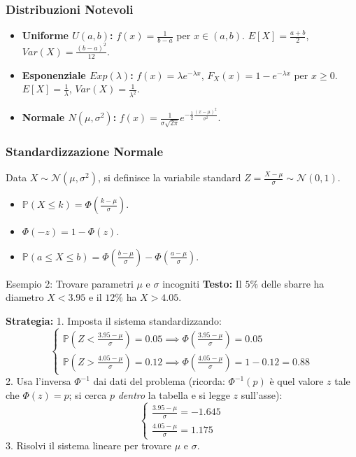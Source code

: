 \documentclass[12pt]{extarticle} %
\begin{document}
\subsubsection{Distribuzioni Notevoli}
\begin{itemize}
    \item \textbf{Uniforme $U(a,b)$:} $f(x) = \frac{1}{b-a}$ per $x \in (a,b)$. $E[X] = \frac{a+b}{2}$, $Var(X) = \frac{(b-a)^2}{12}$.
    \item \textbf{Esponenziale $Exp(\lambda)$:} $f(x) = \lambda e^{-\lambda x}$, $F_X(x) = 1 - e^{-\lambda x}$ per $x \ge 0$. $E[X] = \frac{1}{\lambda}$, $Var(X) = \frac{1}{\lambda^2}$.
    \item \textbf{Normale $N(\mu, \sigma^2)$:} $f(x) = \frac{1}{\sigma\sqrt{2\pi}} e^{-\frac{1}{2}\frac{(x-\mu)^2}{\sigma^2}}$.
\end{itemize}

\subsubsection{Standardizzazione Normale}
Data $X \sim \mathcal{N}(\mu, \sigma^2)$, si definisce la variabile standard $Z = \frac{X-\mu}{\sigma} \sim \mathcal{N}(0,1)$.
\begin{itemize}
    \item $\mathbb{P}(X \le k) = \Phi\left(\frac{k-\mu}{\sigma}\right)$.
    \item $\Phi(-z) = 1 - \Phi(z)$.
    \item $\mathbb{P}(a \le X \le b) = \Phi\left(\frac{b-\mu}{\sigma}\right) - \Phi\left(\frac{a-\mu}{\sigma}\right)$.
\end{itemize}

\begin{eserciziobox}{Esempio 2: Trovare parametri $\mu$ e $\sigma$ incogniti}
\textbf{Testo:} Il $5\%$ delle sbarre ha diametro $X < 3.95$ e il $12\%$ ha $X > 4.05$.
\par\textbf{Strategia:}
1. Imposta il sistema standardizzando:
   \[ \begin{cases} \mathbb{P}(Z < \frac{3.95-\mu}{\sigma}) = 0.05 \implies \Phi(\frac{3.95-\mu}{\sigma}) = 0.05 \\ \mathbb{P}(Z > \frac{4.05-\mu}{\sigma}) = 0.12 \implies \Phi(\frac{4.05-\mu}{\sigma}) = 1 - 0.12 = 0.88 \end{cases} \]
2. Usa l'inversa $\Phi^{-1}$ dai dati del problema {\footnotesize (ricorda: $\Phi^{-1}(p)$ è quel valore $z$ tale che $\Phi(z) = p$; si cerca $p$ \emph{dentro} la tabella e si legge $z$ sull'asse)}:
   \[ \begin{cases} \frac{3.95-\mu}{\sigma} = -1.645 \\ \frac{4.05-\mu}{\sigma} = 1.175 \end{cases} \]
3. Risolvi il sistema lineare per trovare $\mu$ e $\sigma$.
\end{eserciziobox}
\end{document}
